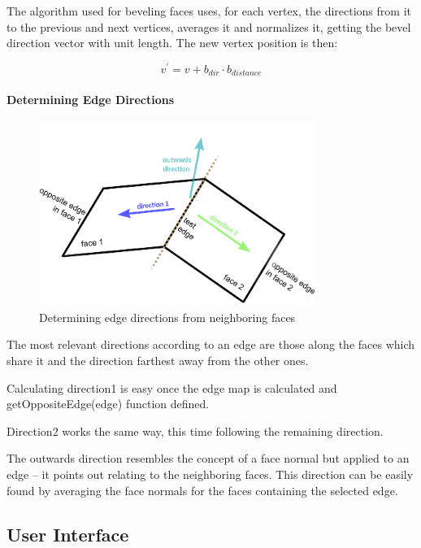 The algorithm used for beveling faces uses, for each vertex,
the directions from it to the previous and next vertices,
averages it and normalizes it, getting the bevel direction vector with unit length.
The new vertex position is then:

\begin{equation}
	v^{'} = v + b_{dir} \cdot b_{distance}
\end{equation}


\paragraph{Determining Edge Directions}

\begin{figure}[!ht]
    \centering
    \includegraphics[width=9cm]{gfx/face-dirs.png}
    \vspace{-0.5cm}
    \caption{Determining edge directions from neighboring faces}
    \label{FIG-GS-FACE-DIRS}
\end{figure}

The most relevant directions according to an edge are those along the faces
which share it and the direction farthest away from the other ones.
 
Calculating direction1 is easy once the edge map is calculated
and getOppositeEdge(edge) function defined.

Direction2 works the same way, this time following the remaining direction.

The outwards direction resembles the concept of a face normal but applied to an edge
-- it points out relating to the neighboring faces.
This direction can be easily found by averaging the face normals
for the faces containing the selected edge.


\subsection{User Interface}

